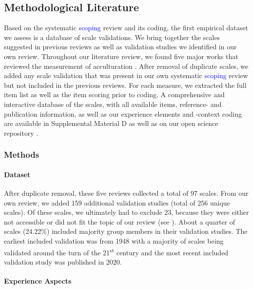 

\subsection{Methodological Literature}

Based on the systematic \textcolor{blue}{scoping} review and its coding,
the first empirical dataset we assess is a database of scale
validations. We bring together the scales suggested in previous reviews
as well as validation studies we identified in our own review.
Throughout our literature review, we found five major works that
reviewed the measurement of acculturation
\citep{Celenk2011, Maestas2000, Matsudaira2006, Wallace2010, Zane2004}.
After removal of duplicate scales, we added any scale validation that
was present in our own systematic \textcolor{blue}{scoping} review but
not included in the previous reviews. For each measure, we extracted the
full item list as well as the item scoring prior to coding. A
comprehensive and interactive database of the scales, with all available
items, reference- and publication information, as well as our experience
elements and -context coding are available in Supplemental Material D as
well as on our open science repository
\citep[see][]{Kreienkamp2021d, Kreienkamp2021e}.

\subsubsection{Methods}  
\paragraph{Dataset}

After duplicate removal, these five reviews collected a total of 97
scales. From our own review, we added 159 additional validation studies
(total of 256 unique scales). Of these scales, we ultimately had to
exclude 23, because they were either not accessible or did not fit the
topic of our review (see ). About a
quarter of scales (24.22\%) included majority group members in their
validation studies. The earliest included validation was from 1948 with
a majority of scales being validated around the turn of the
21\textsuperscript{st} century and the most recent included validation
study was published in 2020.

\paragraph{Experience Aspects}

